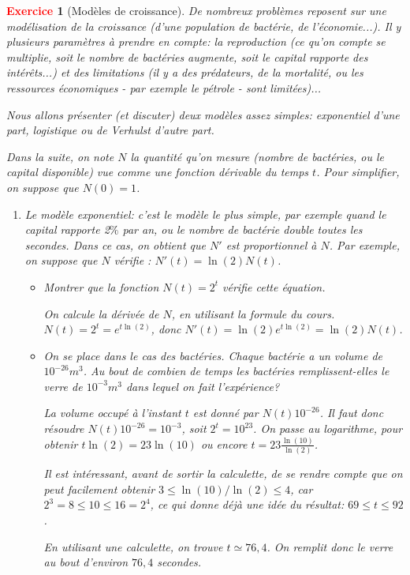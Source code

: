 \documentclass[11pt]{article}
\theoremstyle{mythmstyle}
\newtheorem{exo}{\textcolor{red}{\textbf{Exercice}}}
\begin{document}
\begin{exo}[Modèles de croissance]
De nombreux problèmes reposent sur une modélisation de la croissance (d'une population de bactérie, de l'économie...). Il y plusieurs paramètres à prendre en compte: la reproduction (ce qu'on compte se multiplie, soit le nombre de bactéries augmente, soit le capital rapporte des intérêts...) et des limitations (il y a des prédateurs, de la mortalité, ou les ressources économiques - par exemple le pétrole - sont limitées)...

Nous allons présenter (et discuter) deux modèles assez simples: exponentiel d'une part, logistique ou de Verhulst d'autre part.

Dans la suite, on note $N$ la quantité qu'on mesure (nombre de bactéries, ou le capital disponible) vue comme une fonction dérivable du temps $t$. Pour simplifier, on suppose que $N(0)=1$.
\begin{enumerate}
	\item \emph{Le modèle exponentiel:} c'est le modèle le plus simple, par exemple quand le capital rapporte 2$\%$ par an, ou le nombre de bactérie double toutes les secondes. Dans ce cas, on obtient que $N'$ est proportionnel à $N$. Par exemple, on suppose que $N$ vérifie : $N'(t) = \ln(2)N(t)$.
\begin{itemize}
\item[a)] Montrer que la fonction $N(t) = 2^t$ vérifie cette équation.
\begin{solution}
On calcule la dérivée de $N$, en utilisant la formule du cours. $N(t) = 2^t = e^{t\ln(2)}$, donc $N'(t) = \ln(2)e^{t\ln(2)} = \ln(2)N(t)$.
\end{solution}
		\item[b)] On se place dans le cas des bactéries. Chaque bactérie a un volume de $10^{-26} m^3$. Au bout de combien de temps les bactéries remplissent-elles le verre de $10^{-3} m^3$ dans lequel on fait l'expérience?
\begin{solution}
		La volume occupé à l'instant $t$ est donné par $N(t)10^{-26}$. Il faut donc résoudre $N(t)10^{-26} = 10^{-3}$, soit $2^t = 10^{23}$. On passe au logarithme, pour obtenir $t\ln(2) = 23\ln(10)$ ou encore $t = 23\frac{\ln(10)}{\ln(2)}$. 
		
		Il est intéressant, avant de sortir la calculette, de se rendre compte que on peut facilement obtenir $3\leq \ln(10)/\ln(2)\leq 4$, car $2^3 = 8\leq 10 \leq 16 = 2^4$, ce qui donne déjà une idée du résultat: $69\leq t\leq 92$.
		
		En utilisant une calculette, on trouve $t \simeq 76,4$. On remplit donc le verre au bout d'environ $76,4$ secondes.
\end{solution}
		

\end{itemize}
\end{enumerate}
\end{exo}
\end{document}
